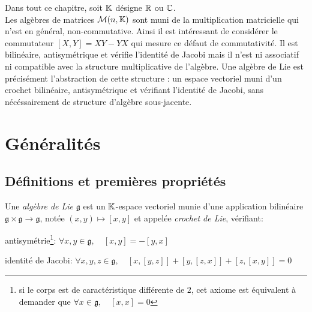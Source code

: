 
\noindent
Dans tout ce chapitre, soit $\mathbb{K}$ désigne $\mathbb{R}$ ou $\mathbb{C}$. \\

Les algèbres de matrices $\mathcal{M}(n, \mathbb{K})$ sont muni de la multiplication matricielle qui n'est en général, non-commutative. Ainsi il est intéressant de considérer le commutateur $[X, Y] = XY-YX$ qui mesure ce défaut de commutativité. Il est bilinéaire, antisymétrique et vérifie l'identité de Jacobi mais il n'est ni associatif ni compatible avec la structure multiplicative de l'algèbre. Une algèbre de Lie est précisément l'abstraction de cette structure : un espace vectoriel muni d'un crochet bilinéaire, antisymétrique et vérifiant l'identité de Jacobi, sans nécéssairement de structure d'algèbre sous-jacente. \\
 
\section{Généralités}
\subsection{Définitions et premières propriétés}

\begin{definition}
    Une \emph{algèbre de Lie} $\mathfrak{g}$ est un $\mathbb{K}$-espace vectoriel munie d'une application bilinéaire $\mathfrak{g}\times \mathfrak{g} \to \mathfrak{g}$, notée $(x,y) \mapsto [x, y]$ et appelée \emph{crochet de Lie}, vérifiant:
    \begin{ilist}
        \item antisymétrie\footnote{si le corps est de caractéristique différente de $2$, cet axiome est équivalent à demander que $\forall x \in \mathfrak{g}, \quad [x,x] = 0$}: $\forall x, y \in \mathfrak{g}, \quad [x, y] = - [y, x]$
        \item identité de Jacobi: $\forall x, y, z \in \mathfrak{g}, \quad [x, [y, z]] + [y, [z, x]] + [z, [x, y]] = 0$
    \end{ilist}
\end{definition}

